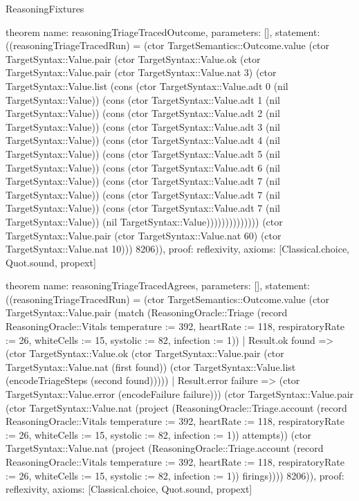 \begin{lexlean}{ReasoningFixtures}
\begin{semanticmodule}
theorem{
  name: reasoningTriageTracedOutcome,
  parameters: [],
  statement: ((reasoningTriageTracedRun) = (ctor TargetSemantics::Outcome.value (ctor TargetSyntax::Value.pair (ctor TargetSyntax::Value.ok (ctor TargetSyntax::Value.pair (ctor TargetSyntax::Value.nat 3) (ctor TargetSyntax::Value.list (cons (ctor TargetSyntax::Value.adt 0 (nil TargetSyntax::Value)) (cons (ctor TargetSyntax::Value.adt 1 (nil TargetSyntax::Value)) (cons (ctor TargetSyntax::Value.adt 2 (nil TargetSyntax::Value)) (cons (ctor TargetSyntax::Value.adt 3 (nil TargetSyntax::Value)) (cons (ctor TargetSyntax::Value.adt 4 (nil TargetSyntax::Value)) (cons (ctor TargetSyntax::Value.adt 5 (nil TargetSyntax::Value)) (cons (ctor TargetSyntax::Value.adt 6 (nil TargetSyntax::Value)) (cons (ctor TargetSyntax::Value.adt 7 (nil TargetSyntax::Value)) (cons (ctor TargetSyntax::Value.adt 7 (nil TargetSyntax::Value)) (cons (ctor TargetSyntax::Value.adt 7 (nil TargetSyntax::Value)) (nil TargetSyntax::Value)))))))))))))) (ctor TargetSyntax::Value.pair (ctor TargetSyntax::Value.nat 60) (ctor TargetSyntax::Value.nat 10))) 8206)),
  proof: reflexivity{},
  axioms: [Classical.choice, Quot.sound, propext]
}

theorem{
  name: reasoningTriageTracedAgrees,
  parameters: [],
  statement: ((reasoningTriageTracedRun) = (ctor TargetSemantics::Outcome.value (ctor TargetSyntax::Value.pair (match (ReasoningOracle::Triage (record ReasoningOracle::Vitals {temperature := 392, heartRate := 118, respiratoryRate := 26, whiteCells := 15, systolic := 82, infection := 1}))
    | Result.ok found => (ctor TargetSyntax::Value.ok (ctor TargetSyntax::Value.pair (ctor TargetSyntax::Value.nat (first found)) (ctor TargetSyntax::Value.list (encodeTriageSteps (second found)))))
    | Result.error failure => (ctor TargetSyntax::Value.error (encodeFailure failure))) (ctor TargetSyntax::Value.pair (ctor TargetSyntax::Value.nat (project (ReasoningOracle::Triage.account (record ReasoningOracle::Vitals {temperature := 392, heartRate := 118, respiratoryRate := 26, whiteCells := 15, systolic := 82, infection := 1})) attempts)) (ctor TargetSyntax::Value.nat (project (ReasoningOracle::Triage.account (record ReasoningOracle::Vitals {temperature := 392, heartRate := 118, respiratoryRate := 26, whiteCells := 15, systolic := 82, infection := 1})) firings)))) 8206)),
  proof: reflexivity{},
  axioms: [Classical.choice, Quot.sound, propext]
}


\end{semanticmodule}
\end{lexlean}
